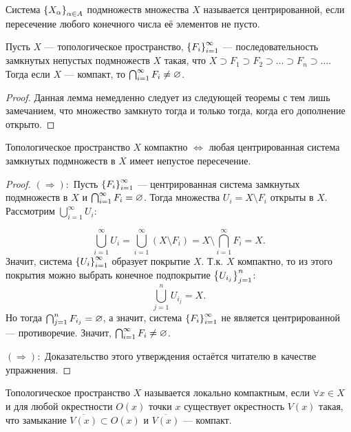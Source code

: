 \begin{definition}
    Система $\left\{X_{\alpha}\right\}_{\alpha \in A}$ подмножеств множества $X$ называется центрированной, если пересечение любого конечного числа её элементов не пусто.
\end{definition}

\begin{lemma}
    Пусть $X$ --- топологическое пространство, $\left\{F_{i}\right\}_{i = 1}^{\infty}$ --- последовательность замкнутых непустых подмножеств $X$ такая, что $X \supset F_1 \supset F_2 \supset \ldots \supset F_{n} \supset \ldots$. 
    Тогда если $X$ --- компакт, то $\bigcap_{i = 1}^{\infty} F_{i} \neq \varnothing$.
\end{lemma}
\begin{proof}
    Данная лемма немедленно следует из следующей теоремы с тем лишь замечанием, что множество замкнуто тогда и только тогда, когда его дополнение открыто.
\end{proof}

\begin{theorem}
    Топологическое пространство $X$ компактно $\Leftrightarrow$ любая центрированная система замкнутых подмножеств в $X$ имеет непустое пересечение. 
\end{theorem}
\begin{proof}
    $(\Rightarrow):$ Пусть $\left\{F_{i}\right\}_{i = 1}^{\infty}$ --- центрированная система замкнутых подмножеств в $X$ и $\bigcap_{i = 1}^{\infty} F_{i} = \varnothing$. Тогда множества $U_{i} = X \setminus F_{i}$ открыты в $X$.
    Рассмотрим $\bigcup_{i = 1}^{\infty} U_{i}$:

    \[
        \bigcup_{i = 1}^{\infty} U_{i} = \bigcup_{i = 1}^{\infty} (X \setminus F_{i}) = X \setminus \bigcap_{i = 1}^{\infty} F_{i} = X.
    \]
    Значит, система $\left\{U_{i}\right\}_{i = 1}^{\infty}$ образует покрытие $X$. Т.к. $X$ компактно, то из этого покрытия можно выбрать конечное подпокрытие $\left\{U_{i_j}\right\}_{j = 1}^{n}$:
    \[
        \bigcup_{j = 1}^{n} U_{i_j} = X.
    \]
    Но тогда $\bigcap_{j = 1}^{n} F_{i_j} = \varnothing$, а значит, система $\left\{F_{i}\right\}_{i = 1}^{\infty}$ не является центрированной --- противоречие. Значит, $\bigcap_{i = 1}^{\infty} F_{i} \neq \varnothing$.

    $(\Rightarrow):$ Доказательство этого утверждения остаётся читателю в качестве упражнения.
\end{proof}

\begin{definition}
    Топологическое пространство $X$ называется локально компактным, если $\forall x \in X$ и для любой окрестности $O(x)$ точки $x$ существует окрестность $V(x)$ такая, что
    замыкание $\overline{V(x)} \subset O(x)$ и $\overline{V(x)}$ --- компакт.
\end{definition}

